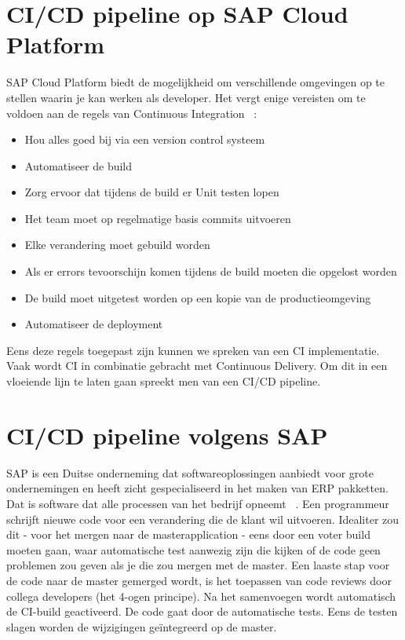 \section{CI/CD pipeline op SAP Cloud Platform}
\label{sec:ci-cd-op-sap-cloud-platform}
    SAP Cloud Platform biedt de mogelijkheid om verschillende omgevingen op te stellen waarin je kan werken als developer. Het vergt enige vereisten om te voldoen aan de regels van Continuous Integration ~\autocite{Kramer2018}:
    \begin{itemize}
        \item Hou alles goed bij via een version control systeem
        \item Automatiseer de build
        \item Zorg ervoor dat tijdens de build er Unit testen lopen
        \item Het team moet op regelmatige basis commits uitvoeren
        \item Elke verandering moet gebuild worden
        \item Als er errors tevoorschijn komen tijdens de build moeten die opgelost worden
        \item De build moet uitgetest worden op een kopie van de productieomgeving
        \item Automatiseer de deployment
    \end{itemize}
    Eens deze regels toegepast zijn kunnen we spreken van een CI implementatie.
    Vaak wordt CI in combinatie gebracht met Continuous Delivery. Om dit in een vloeiende lijn te laten gaan spreekt men van een CI/CD pipeline.

\section{CI/CD pipeline volgens SAP}
\label{sec:ci-cd-pipeling-volgens-sap}
    SAP is een Duitse onderneming dat softwareoplossingen aanbiedt voor grote ondernemingen en heeft zicht gespecialiseerd in het maken van ERP pakketten. Dat is software dat alle processen van het bedrijf opneemt ~\autocite{SAPERP2019}.
    Een programmeur schrijft nieuwe code voor een verandering die de klant wil uitvoeren. Idealiter zou dit - voor het mergen naar de masterapplication - eens door een voter build moeten gaan, waar automatische test aanwezig zijn die kijken of de code geen problemen zou geven als je die zou mergen met de master. Een laaste stap voor de code naar de master gemerged wordt, is het toepassen van code reviews door collega developers (het 4-ogen principe).
    Na het samenvoegen wordt automatisch de CI-build geactiveerd. De code gaat door de automatische tests. Eens de testen slagen worden de wijzigingen geïntegreerd op de master. 
    

